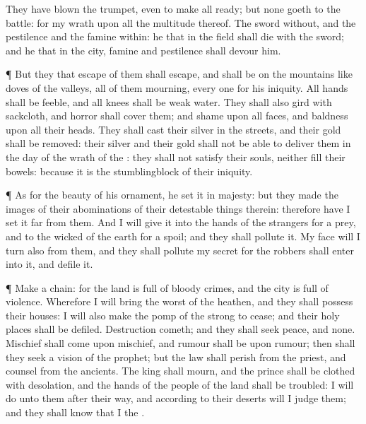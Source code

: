 {They have
blown the
trumpet, even to make all
ready; but none
goeth to the
battle: for my
wrath
{} upon all the
multitude thereof.
The
sword
{}
without, and the
pestilence and the
famine
within: he that
{} in the
field shall
die with the
sword; and he that
{} in the
city,
famine and
pestilence shall
devour him.
\par }{\PP {}¶ But they that
escape of them shall
escape, and shall be on the
mountains like
doves of the
valleys, all of them
mourning, every
one for his
iniquity.
All
hands shall be
feeble, and all
knees shall be
weak
{}
water.
They shall also
gird
{} with
sackcloth, and
horror shall
cover them; and
shame
{} upon all
faces, and
baldness upon all their
heads.
They shall
cast their
silver in the
streets, and their
gold shall be
removed: their
silver and their
gold shall not be
able to
deliver them in the
day of the
wrath of the
{}: they shall not
satisfy their
souls, neither
fill their
bowels: because it is the
stumblingblock of their
iniquity.
\par }{\PP {}¶ As for the
beauty of his
ornament, he
set it in
majesty: but they
made the
images of their
abominations
{} of their detestable
things therein: therefore have I
set it
far from them.
And I will
give it into the
hands of the
strangers for a
prey, and to the
wicked of the
earth for a
spoil; and they shall
pollute it.
My
face will I
turn also from them, and they shall
pollute my
secret
{} for the
robbers shall
enter into it, and
defile it.
\par }{\PP {}¶
Make a
chain: for the
land is
full of
bloody
crimes, and the
city is
full of
violence.
Wherefore I will
bring the
worst of the
heathen, and they shall
possess their
houses: I will also make the
pomp of the
strong to
cease; and their holy
places shall be
defiled.
Destruction
cometh; and they shall
seek
peace, and
{} none.
Mischief shall
come upon
mischief, and
rumour shall be upon
rumour; then shall they
seek a
vision of the
prophet; but the
law shall
perish from the
priest, and
counsel from the
ancients.
The
king shall
mourn, and the
prince shall be
clothed with
desolation, and the
hands of the
people of the
land shall be
troubled: I will
do unto them after their
way, and according to their
deserts will I
judge them; and they shall
know that I
{} the
{}.

}
